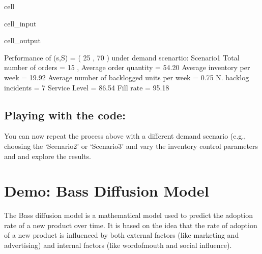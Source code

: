 \documentclass[letterpaper,10pt,english]{jupyterBook}
\begin{document}
\begin{sphinxuseclass}{cell}
\begin{sphinxVerbatimInput}
\begin{sphinxuseclass}{cell_input}
\end{sphinxuseclass}\end{sphinxVerbatimInput}
\begin{sphinxVerbatimOutput}

\begin{sphinxuseclass}{cell_output}
\begin{sphinxVerbatim}[commandchars=\\\{\}]
Performance of (s,S) = ( 25 , 70 ) under demand scenartio: Scenario1
Total number of orders = 15 , Average order quantity = 54.20
Average inventory per week = 19.92
Average number of backlogged units per week = \PYGZhy{}0.75
N. backlog incidents = 7
Service Level = 86.54 \PYGZpc{}
Fill rate = 95.18 \PYGZpc{}
\end{sphinxVerbatim}

\end{sphinxuseclass}\end{sphinxVerbatimOutput}

\end{sphinxuseclass}

\section{Playing with the code:}
\label{\detokenize{docs/Ex_Lecture_Demo_Inventory_Sim:playing-with-the-code}}
\sphinxAtStartPar
You can now repeat the process above with a different demand scenario (e.g., choosing the ‘Scenario2’ or ‘Scenario3’ and vary the inventory control parameters  and  and explore the results.

\sphinxstepscope


\chapter{Demo: Bass Diffusion Model}
\label{\detokenize{docs/Ex_Bass_diffusion_full_demo:demo-bass-diffusion-model}}\label{\detokenize{docs/Ex_Bass_diffusion_full_demo::doc}}
\sphinxAtStartPar
The Bass diffusion model is a mathematical model used to predict the adoption rate of a new product over time. It is based on the idea that the rate of adoption of a new product is influenced by both external factors (like marketing and advertising) and internal factors (like word\sphinxhyphen{}of\sphinxhyphen{}mouth and social influence).
\end{document}
